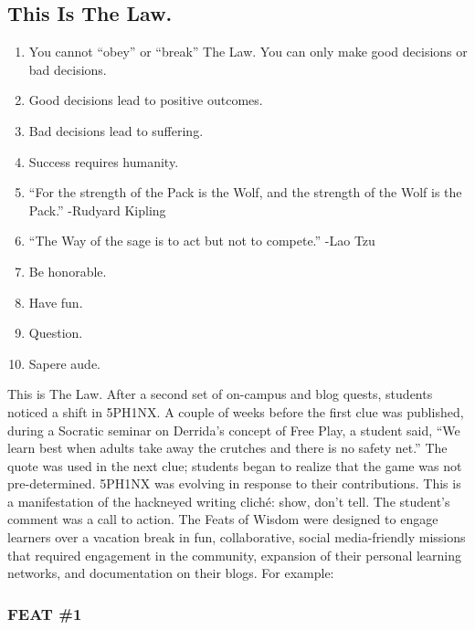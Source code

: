 \subsection{This Is The Law.}

\begin{enumerate}[itemsep=0pt]
\item
  You cannot ``obey'' or ``break'' The Law. You can only make good
  decisions or bad decisions.
\item
  Good decisions lead to positive outcomes.
\item
  Bad decisions lead to suffering.
\item
  Success requires humanity.
\item
  ``For the strength of the Pack is the Wolf, and the strength of the
  Wolf is the Pack.'' -Rudyard Kipling
\item
  ``The Way of the sage is to act but not to compete.'' -Lao Tzu
\item
  Be honorable.
\item
  Have fun.
\item
  Question.
\item
  Sapere aude.
\end{enumerate}
This is The Law. After a second set of on-campus and blog quests,
students noticed a shift in 5PH1NX. A couple of weeks before the first
clue was published, during a Socratic seminar on Derrida's concept of
Free Play, a student said, ``We learn best when adults take away the
crutches and there is no safety net.'' The quote was used in the next
clue; students began to realize that the game was not pre-determined.
5PH1NX was evolving in response to their contributions. This is a
manifestation of the hackneyed writing cliché: show, don't tell.
The student's comment was a call to action. The Feats of Wisdom were
designed to engage learners over a vacation break in fun, collaborative,
social media-friendly missions that required engagement in the
community, expansion of their personal learning networks, and
documentation on their blogs.   For example:

\subsubsection{FEAT \#1}

